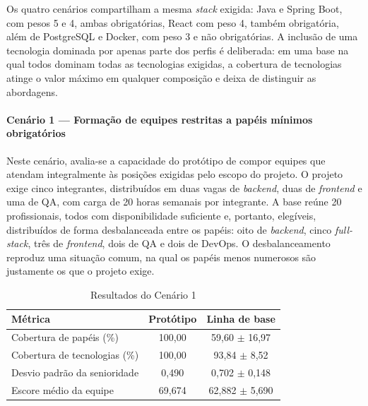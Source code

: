 \begin{table}[htbp]
\centering
\caption{Configuração dos cenários de avaliação}
\label{tab:cenarios}
\end{table}

Os quatro cenários compartilham a mesma \textit{stack} exigida: Java e Spring Boot, com pesos 5 e 4, ambas obrigatórias, React com peso 4, também obrigatória, além de PostgreSQL e Docker, com peso 3 e não obrigatórias. A inclusão de uma tecnologia dominada por apenas parte dos perfis é deliberada: em uma base na qual todos dominam todas as tecnologias exigidas, a cobertura de tecnologias atinge o valor máximo em qualquer composição e deixa de distinguir as abordagens.

\paragraph{Cenário 1 — Formação de equipes restritas a papéis mínimos obrigatórios}

Neste cenário, avalia-se a capacidade do protótipo de compor equipes que atendam integralmente às posições exigidas pelo escopo do projeto. O projeto exige cinco integrantes, distribuídos em duas vagas de \textit{backend}, duas de \textit{frontend} e uma de QA, com carga de 20 horas semanais por integrante. A base reúne 20 profissionais, todos com disponibilidade suficiente e, portanto, elegíveis, distribuídos de forma desbalanceada entre os papéis: oito de \textit{backend}, cinco \textit{full-stack}, três de \textit{frontend}, dois de QA e dois de DevOps. O desbalanceamento reproduz uma situação comum, na qual os papéis menos numerosos são justamente os que o projeto exige.

\begin{table}[htbp]
\centering
\caption{Resultados do Cenário 1}
\label{tab:cenario1}
\begin{tabular}{lcc}
\hline
\textbf{Métrica} & \textbf{Protótipo} & \textbf{Linha de base} \\
\hline
Cobertura de papéis (\%) & 100,00 & 59,60 $\pm$ 16,97 \\
Cobertura de tecnologias (\%) & 100,00 & 93,84 $\pm$ 8,52 \\
Desvio padrão da senioridade & 0,490 & 0,702 $\pm$ 0,148 \\
Escore médio da equipe & 69,674 & 62,882 $\pm$ 5,690 \\
\hline
\end{tabular}
\end{table}

